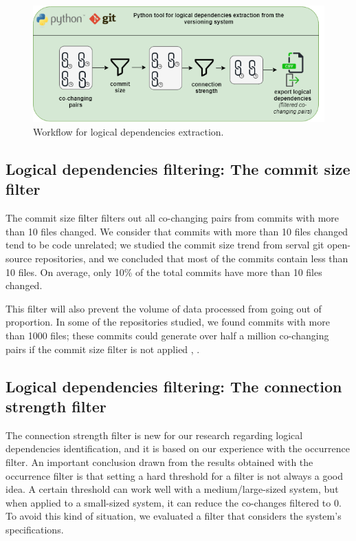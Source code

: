 \documentclass[runningheads]{comsis2}
\begin{document}
\begin{figure}
\centering
\includegraphics[width=\textwidth]{ld_workflow.png}
\caption{Workflow for logical dependencies extraction.}
\label{fig:workflow_key}
\centering
\end{figure}

\subsection{Logical dependencies filtering: The commit size filter}
\label{commit_filter}

The commit size filter filters out all co-changing pairs from commits with more than 10 files changed. We consider that commits with more than 10 files changed tend to be code unrelated; we studied the commit size trend from serval git open-source repositories, and we concluded that most of the commits contain less than 10 files. On average, only 10\% of the total commits have more than 10 files changed. 

This filter will also prevent the volume of data processed from going out of proportion. In some of the repositories studied, we found commits with more than 1000 files; these commits could generate over half a million co-changing pairs if the commit size filter is not applied \cite{enase19}, \cite{saci19}. 



\subsection{Logical dependencies filtering: The connection strength filter}
\label{strength_filter}


The connection strength filter is new for our research regarding logical dependencies identification, and it is based on our experience with the occurrence filter.
An important conclusion drawn from the results obtained with the occurrence filter is that setting a hard threshold for a filter is not always a good idea. A certain threshold can work well with a medium/large-sized system, but when applied to a small-sized system, it can reduce the co-changes filtered to 0. To avoid this kind of situation, we evaluated a filter that considers the system's specifications. 
\end{document}
